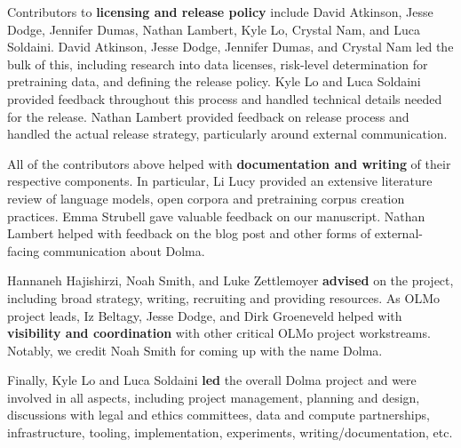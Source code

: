 Contributors to \textbf{licensing and release policy} include David Atkinson, Jesse Dodge, Jennifer Dumas, Nathan Lambert, Kyle Lo, Crystal Nam, and Luca Soldaini. 
David Atkinson, Jesse Dodge, Jennifer Dumas, and Crystal Nam led the bulk of this, including research into data licenses, risk-level determination for pretraining data, and defining the release policy. 
Kyle Lo and Luca Soldaini provided feedback throughout this process and handled technical details needed for the release.
Nathan Lambert provided feedback on release process and handled the actual release strategy, particularly around external communication.

All of the contributors above helped with \textbf{documentation and writing} of their respective components. In particular, Li Lucy provided an extensive literature review of language models, open corpora and pretraining corpus creation practices. Emma Strubell gave valuable feedback on our manuscript.
Nathan Lambert helped with feedback on the blog post and other forms of external-facing communication about Dolma.

Hannaneh Hajishirzi, Noah Smith, and Luke Zettlemoyer \textbf{advised} on the project, including broad strategy, writing, recruiting and providing resources. As OLMo project leads, Iz Beltagy, Jesse Dodge, and Dirk Groeneveld helped with \textbf{visibility and coordination} with other critical OLMo project workstreams. Notably, we credit Noah Smith for coming up with the name Dolma.

Finally, Kyle Lo and Luca Soldaini \textbf{led} the overall Dolma project and were involved in all aspects, including project management, planning and design, discussions with legal and ethics committees, data and compute partnerships, infrastructure, tooling, implementation, experiments, writing/documentation, etc.
